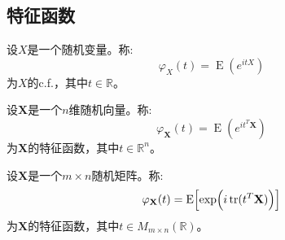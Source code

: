 \subsection{特征函数}
\begin{definition}
	设$X$是一个随机变量。称:
	\begin{equation*}
		\varphi_X(t)=\operatorname{E}(e^{itX})
	\end{equation*}
	为$X$的\gls{c.f.}，其中$t\in\mathbb{R}$。
\end{definition}
\begin{definition}
	设$\mathbf{X}$是一个$n$维随机向量。称:
	\begin{equation*}
		\varphi_\mathbf{X}(t)=\operatorname{E}(e^{it^T\mathbf{X}})
	\end{equation*}
	为$\mathbf{X}$的特征函数，其中$t\in\mathbb{R}^{n}$。
\end{definition}
\begin{definition}
	设$\mathbf{X}$是一个$m\times n$随机矩阵。称:
	\begin{equation*}
		\varphi_\mathbf{X}(t)=\operatorname{E}\Bigl[\exp\Bigl(i\operatorname{tr}(t^T\mathbf{X})\Bigr)\Bigr]
	\end{equation*}
	为$\mathbf{X}$的特征函数，其中$t\in M_{m\times n}(\mathbb{R})$。
\end{definition}
